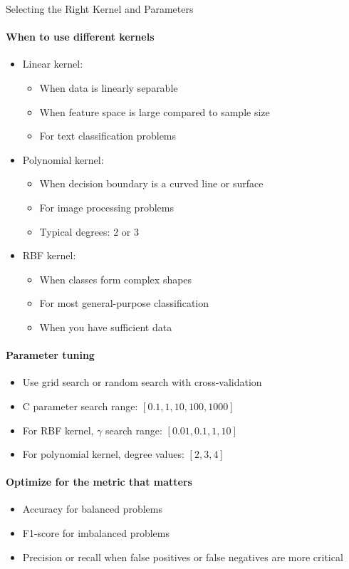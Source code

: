 \begin{KR}{Selecting the Right Kernel and Parameters}\\
\paragraph{When to use different kernels}
\begin{itemize}
    \item Linear kernel: 
    \begin{itemize}
        \item When data is linearly separable
        \item When feature space is large compared to sample size
        \item For text classification problems
    \end{itemize}
    \item Polynomial kernel:
    \begin{itemize}
        \item When decision boundary is a curved line or surface
        \item For image processing problems
        \item Typical degrees: 2 or 3
    \end{itemize}
    \item RBF kernel:
    \begin{itemize}
        \item When classes form complex shapes
        \item For most general-purpose classification
        \item When you have sufficient data
    \end{itemize}
\end{itemize}

\paragraph{Parameter tuning}
\begin{itemize}
    \item Use grid search or random search with cross-validation
    \item C parameter search range: $[0.1, 1, 10, 100, 1000]$
    \item For RBF kernel, $\gamma$ search range: $[0.01, 0.1, 1, 10]$
    \item For polynomial kernel, degree values: $[2, 3, 4]$
\end{itemize}

\paragraph{Optimize for the metric that matters}
\begin{itemize}
    \item Accuracy for balanced problems
    \item F1-score for imbalanced problems
    \item Precision or recall when false positives or false negatives are more critical
\end{itemize}
\end{KR}


